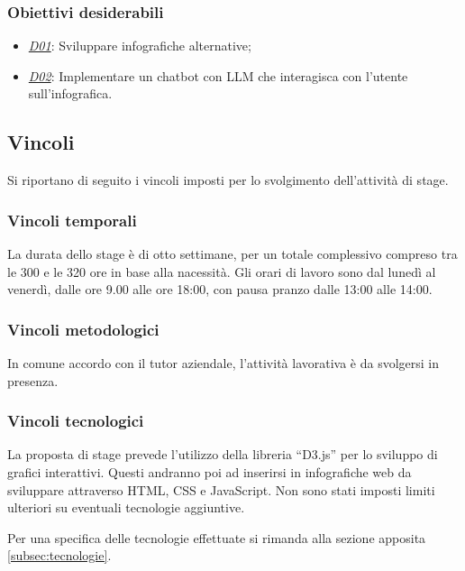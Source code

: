 \subsubsection{Obiettivi desiderabili}
\begin{itemize}
    \item \underline{\textit{D01}}: Sviluppare infografiche alternative;
    \item \underline{\textit{D02}}: Implementare un chatbot con LLM che interagisca con l'utente sull'infografica.
\end{itemize}

\subsection{Vincoli}
Si riportano di seguito i vincoli imposti per lo svolgimento dell'attività di stage.

\subsubsection{Vincoli temporali}
La durata dello stage è di otto settimane, per un totale complessivo compreso tra le 300 e le 320 ore in base alla nacessità.
Gli orari di lavoro sono dal lunedì al venerdì, dalle ore 9.00 alle ore 18:00, con pausa pranzo dalle 13:00 alle 14:00.

\subsubsection{Vincoli metodologici}
In comune accordo con il tutor aziendale, l'attività lavorativa è da svolgersi in presenza.

\subsubsection{Vincoli tecnologici}
La proposta di stage prevede l'utilizzo della libreria ``D3.js'' per lo sviluppo
di grafici interattivi. Questi andranno poi ad inserirsi in infografiche web da 
sviluppare attraverso HTML, CSS e JavaScript.
Non sono stati imposti limiti ulteriori su eventuali tecnologie aggiuntive.

Per una specifica delle tecnologie effettuate si rimanda alla sezione apposita \ref{subsec:tecnologie}.



